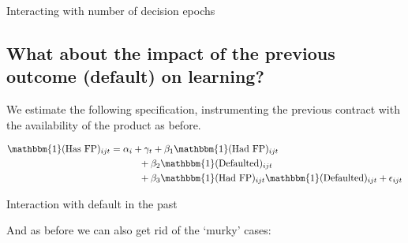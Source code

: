 \documentclass[oneside,11pt]{article}
\begin{document}
\begin{table}[H]
\caption{Interacting with number of decision epochs}
\begin{center}
\scriptsize{}
\end{center}
 \scriptsize

\end{table}


\subsection*{What about the impact of the previous outcome (default) on learning?}

We estimate the following specification, instrumenting the previous contract with the availability of the product as before. 


\begin{align*}
    \mathbbm{1}(\text{Has FP})_{ijt} &= \alpha_i + \gamma_t + \beta_1\mathbbm{1}(\text{Had FP})_{ijt} \\
    & \qquad \quad + \beta_2\mathbbm{1}(\text{Defaulted})_{ijt} \\
    & \qquad \quad  + \beta_3\mathbbm{1}(\text{Had FP})_{ijt}\mathbbm{1}(\text{Defaulted})_{ijt}   + \epsilon_{ijt}
\end{align*}



\begin{table}[H]
\caption{Interaction with default in the past}
\begin{center}
\scriptsize{}
\end{center}
 \scriptsize

\end{table}



And as before we can also get rid of the `murky' cases:



\end{document}
